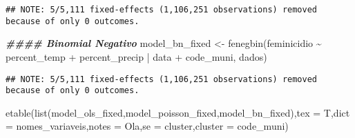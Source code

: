 \documentclass[
]{article}
\newenvironment{Shaded}{\begin{snugshade}}{\end{snugshade}}
\newcommand{\AttributeTok}[1]{\textcolor[rgb]{0.77,0.63,0.00}{#1}}
\newcommand{\DocumentationTok}[1]{\textcolor[rgb]{0.56,0.35,0.01}{\textbf{\textit{#1}}}}
\newcommand{\FunctionTok}[1]{\textcolor[rgb]{0.00,0.00,0.00}{#1}}
\newcommand{\NormalTok}[1]{#1}
\newcommand{\OtherTok}[1]{\textcolor[rgb]{0.56,0.35,0.01}{#1}}
\newcommand{\SpecialCharTok}[1]{\textcolor[rgb]{0.00,0.00,0.00}{#1}}
\newcommand{\StringTok}[1]{\textcolor[rgb]{0.31,0.60,0.02}{#1}}
\begin{document}
\begin{verbatim}
## NOTE: 5/5,111 fixed-effects (1,106,251 observations) removed because of only 0 outcomes.
\end{verbatim}

\begin{Shaded}
\begin{Highlighting}[]
\DocumentationTok{\#\#\#\# Binomial Negativo}
\NormalTok{model\_bn\_fixed }\OtherTok{\textless{}{-}} \FunctionTok{fenegbin}\NormalTok{(feminicidio  }\SpecialCharTok{\textasciitilde{}}\NormalTok{ percent\_temp }\SpecialCharTok{+}\NormalTok{ percent\_precip }\SpecialCharTok{|}\NormalTok{ data }\SpecialCharTok{+}\NormalTok{ code\_muni, dados)}
\end{Highlighting}
\end{Shaded}

\begin{verbatim}
## NOTE: 5/5,111 fixed-effects (1,106,251 observations) removed because of only 0 outcomes.
\end{verbatim}

\begin{Shaded}
\begin{Highlighting}[]
\FunctionTok{etable}\NormalTok{(}\FunctionTok{list}\NormalTok{(model\_ols\_fixed,model\_poisson\_fixed,model\_bn\_fixed),}\AttributeTok{tex =}\NormalTok{ T,}\AttributeTok{dict =}\NormalTok{ nomes\_variaveis,}\AttributeTok{notes =} \StringTok{\textquotesingle{}Ola\textquotesingle{}}\NormalTok{,}\AttributeTok{se =} \StringTok{\textquotesingle{}cluster\textquotesingle{}}\NormalTok{,}\AttributeTok{cluster =} \StringTok{\textquotesingle{}code\_muni\textquotesingle{}}\NormalTok{)}
\end{Highlighting}
\end{Shaded}
\end{document}
